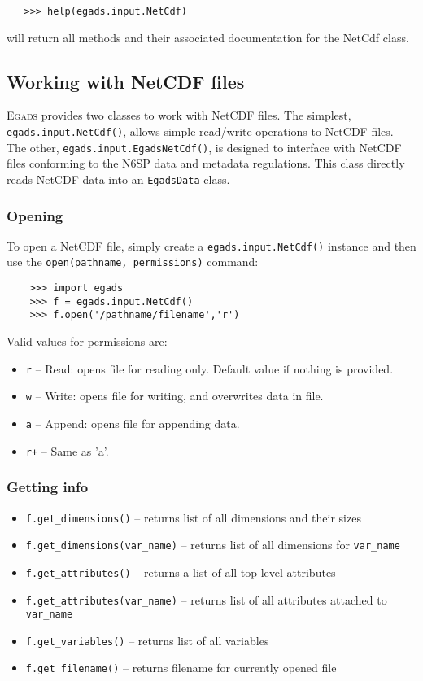 \documentclass[a4paper,11pt]{report}
\newcommand{\Egads}{\textsc{Egads} }
\begin{document}
\begin{verbatim}
   >>> help(egads.input.NetCdf)
\end{verbatim}
will return all methods and their associated documentation for the NetCdf class.

\subsection{Working with NetCDF files}

\Egads provides two classes to work with NetCDF files. The simplest, \verb|egads.input.NetCdf()|, allows simple read/write operations to NetCDF files. The other, \verb|egads.input.EgadsNetCdf()|, is designed to interface with NetCDF files conforming to the N6SP data and metadata regulations. This class directly reads NetCDF data into an \verb|EgadsData| class.

\subsubsection{Opening}

To open a NetCDF file, simply create a \verb|egads.input.NetCdf()| instance and then use the \verb|open(pathname, permissions)| command:

\begin{verbatim}
    >>> import egads
    >>> f = egads.input.NetCdf()
    >>> f.open('/pathname/filename','r')
\end{verbatim}
%
Valid values for permissions are:

\begin{itemize}
 \item \verb|r| -- Read: opens file for reading only. Default value if nothing is provided.
 \item \verb|w| -- Write: opens file for writing, and overwrites data in file.
 \item \verb|a| -- Append: opens file for appending data.
 \item \verb|r+| -- Same as 'a'.
\end{itemize}


\subsubsection{Getting info}

\begin{itemize}
\item \verb|f.get_dimensions()| -- returns list of all dimensions and their sizes
\item \verb|f.get_dimensions(var_name)| -- returns list of all dimensions for \verb|var_name|
\item \verb|f.get_attributes()| -- returns a list of all top-level attributes
\item \verb|f.get_attributes(var_name)| -- returns list of all attributes attached to \verb|var_name|
\item \verb|f.get_variables()| -- returns list of all variables
\item \verb|f.get_filename()| -- returns filename for currently opened file
\end{itemize}
\end{document}
